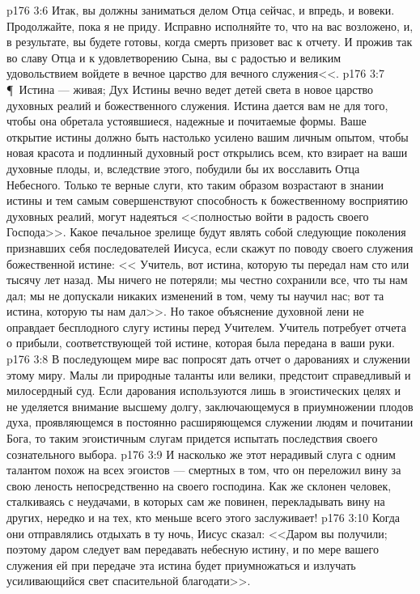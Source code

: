 \vs p176 3:6 Итак, вы должны заниматься делом Отца сейчас, и впредь, и вовеки. Продолжайте, пока я не приду. Исправно исполняйте то, что на вас возложено, и, в результате, вы будете готовы, когда смерть призовет вас к отчету. И прожив так во славу Отца и к удовлетворению Сына, вы с радостью и великим удовольствием войдете в вечное царство для вечного служения<<.
\vs p176 3:7 \P\ Истина --- живая; Дух Истины вечно ведет детей света в новое царство духовных реалий и божественного служения. Истина дается вам не для того, чтобы она обретала устоявшиеся, надежные и почитаемые формы. Ваше открытие истины должно быть настолько усилено вашим личным опытом, чтобы новая красота и подлинный духовный рост открылись всем, кто взирает на ваши духовные плоды, и, вследствие этого, побудили бы их восславить Отца Небесного. Только те верные слуги, кто таким образом возрастают в знании истины и тем самым совершенствуют способность к божественному восприятию духовных реалий, могут надеяться <<полностью войти в радость своего Господа>>. Какое печальное зрелище будут являть собой следующие поколения признавших себя последователей Иисуса, если скажут по поводу своего служения божественной истине: << Учитель, вот истина, которую ты передал нам сто или тысячу лет назад. Мы ничего не потеряли; мы честно сохранили все, что ты нам дал; мы не допускали никаких изменений в том, чему ты научил нас; вот та истина, которую ты нам дал>>. Но такое объяснение духовной лени не оправдает бесплодного слугу истины перед Учителем. Учитель потребует отчета о прибыли, соответствующей той истине, которая была передана в ваши руки.
\vs p176 3:8 В последующем мире вас попросят дать отчет о дарованиях и служении этому миру. Малы ли природные таланты или велики, предстоит справедливый и милосердный суд. Если дарования используются лишь в эгоистических целях и не уделяется внимание высшему долгу, заключающемуся в приумножении плодов духа, проявляющемся в постоянно расширяющемся служении людям и почитании Бога, то таким эгоистичным слугам придется испытать последствия своего сознательного выбора.
\vs p176 3:9 И насколько же этот нерадивый слуга с одним талантом похож на всех эгоистов --- смертных в том, что он переложил вину за свою леность непосредственно на своего господина. Как же склонен человек, сталкиваясь с неудачами, в которых сам же повинен, перекладывать вину на других, нередко и на тех, кто меньше всего этого заслуживает!
\vs p176 3:10 Когда они отправлялись отдыхать в ту ночь, Иисус сказал: <<Даром вы получили; поэтому даром следует вам передавать небесную истину, и по мере вашего служения ей при передаче эта истина будет приумножаться и излучать усиливающийся свет спасительной благодати>>.
